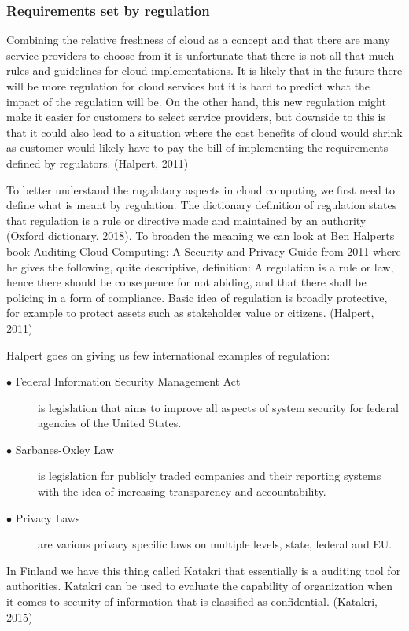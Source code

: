 \documentclass{article}
\begin{document}
\subsubsection{Requirements set by regulation}
Combining the relative freshness of cloud as a concept and that there are many service providers to choose from it is unfortunate that there is not all that much rules and guidelines for cloud implementations.
It is likely that in the future there will be more regulation for cloud services but it is hard to predict what the impact of the regulation will be. On the other hand, this new regulation might make it easier for customers to select service providers, but downside to this is that it could also lead to a situation where the cost benefits of cloud would shrink as customer would likely have to pay the bill of implementing the requirements defined by regulators. (Halpert, 2011)
\par
To better understand the rugalatory aspects in cloud computing we first need to define what is meant by regulation.
The dictionary definition of regulation states that regulation is a rule or directive made and maintained by an authority (Oxford dictionary, 2018).
To broaden the meaning we can look at Ben Halperts book Auditing Cloud Computing: A Security and Privacy Guide from 2011 where he gives the following, quite descriptive, definition: A regulation is a rule or law, hence there should be consequence for not abiding, and that there shall be policing in a form of compliance. Basic idea of regulation is broadly protective, for example to protect assets such as stakeholder value or citizens. (Halpert, 2011)
\par
Halpert goes on giving us few international examples of regulation:
\begin{description}
	\item[$\bullet$ Federal Information Security Management Act] is legislation that aims to improve all aspects of system security for federal agencies of the United States.
	\item[$\bullet$ Sarbanes-Oxley Law] is legislation for publicly traded companies and their reporting systems with the idea of increasing transparency and accountability.
	\item[$\bullet$ Privacy Laws] are various privacy specific laws on multiple levels, state, federal and EU.
\end{description}
In Finland we have this thing called Katakri that essentially is a auditing tool for authorities. Katakri can be used to evaluate the capability of organization when it comes to security of information that is classified as confidential. (Katakri, 2015)
\end{document}
